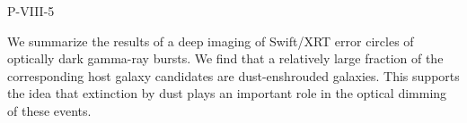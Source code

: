 P-VIII-5


\bigskip



\bigskip

\noindent We summarize the results of a deep 
imaging of Swift/XRT error circles 
of optically dark gamma-ray bursts.
We find that a relatively large fraction of the corresponding host galaxy candidates are dust-enshrouded galaxies. This supports the idea that extinction by dust plays an important role in the 
optical dimming of these events.

